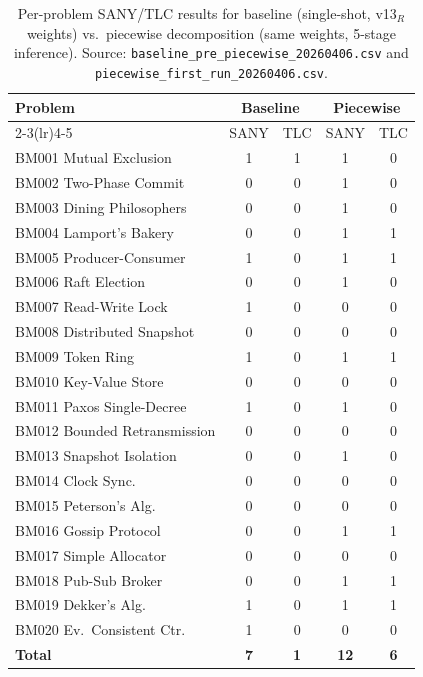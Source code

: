 \documentclass[10pt,twocolumn]{article}
\begin{document}
\begin{table}[t]
\centering
\scriptsize
\setlength{\tabcolsep}{2.5pt}
\begin{tabular}{@{}lcc cc@{}}
\toprule
Problem & \multicolumn{2}{c}{Baseline} & \multicolumn{2}{c}{Piecewise} \\
\cmidrule(lr){2-3}\cmidrule(lr){4-5}
        & SANY & TLC & SANY & TLC \\
\midrule
BM001 Mutual Exclusion      & 1 & 1 & 1 & 0 \\
BM002 Two-Phase Commit      & 0 & 0 & 1 & 0 \\
BM003 Dining Philosophers   & 0 & 0 & 1 & 0 \\
BM004 Lamport's Bakery      & 0 & 0 & 1 & 1 \\
BM005 Producer-Consumer     & 1 & 0 & 1 & 1 \\
BM006 Raft Election         & 0 & 0 & 1 & 0 \\
BM007 Read-Write Lock       & 1 & 0 & 0 & 0 \\
BM008 Distributed Snapshot  & 0 & 0 & 0 & 0 \\
BM009 Token Ring            & 1 & 0 & 1 & 1 \\
BM010 Key-Value Store       & 0 & 0 & 0 & 0 \\
BM011 Paxos Single-Decree   & 1 & 0 & 1 & 0 \\
BM012 Bounded Retransmission & 0 & 0 & 0 & 0 \\
BM013 Snapshot Isolation    & 0 & 0 & 1 & 0 \\
BM014 Clock Sync.           & 0 & 0 & 0 & 0 \\
BM015 Peterson's Alg.       & 0 & 0 & 0 & 0 \\
BM016 Gossip Protocol       & 0 & 0 & 1 & 1 \\
BM017 Simple Allocator      & 0 & 0 & 0 & 0 \\
BM018 Pub-Sub Broker        & 0 & 0 & 1 & 1 \\
BM019 Dekker's Alg.         & 1 & 0 & 1 & 1 \\
BM020 Ev.\ Consistent Ctr. & 1 & 0 & 0 & 0 \\
\midrule
\textbf{Total}              & \textbf{7} & \textbf{1}
                            & \textbf{12} & \textbf{6} \\
\bottomrule
\end{tabular}
\caption{Per-problem SANY/TLC results for baseline (single-shot, v13$_R$
weights) vs.\ piecewise decomposition (same weights, 5-stage inference).
Source: \texttt{baseline\_pre\_piecewise\_20260406.csv} and
\texttt{piecewise\_first\_run\_20260406.csv}.}
\label{tab:pwproblem}
\end{table}
\end{document}
